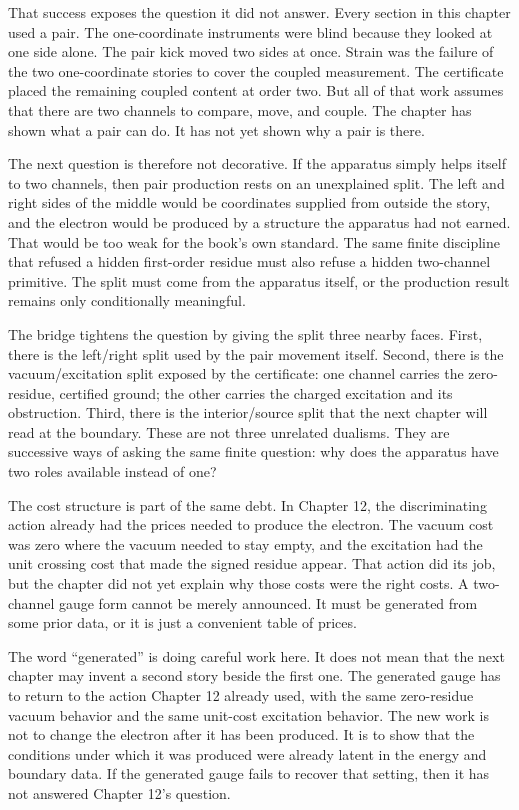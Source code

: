 That success exposes the question it did not answer. Every section in this
chapter used a pair. The one-coordinate instruments were blind because they
looked at one side alone. The pair kick moved two sides at once. Strain was the
failure of the two one-coordinate stories to cover the coupled measurement. The
certificate placed the remaining coupled content at order two. But all of that
work assumes that there are two channels to compare, move, and couple. The
chapter has shown what a pair can do. It has not yet shown why a pair is there.

The next question is therefore not decorative. If the apparatus simply helps
itself to two channels, then pair production rests on an unexplained split. The
left and right sides of the middle would be coordinates supplied from outside
the story, and the electron would be produced by a structure the apparatus had
not earned. That would be too weak for the book's own standard. The same
finite discipline that refused a hidden first-order residue must also refuse a
hidden two-channel primitive. The split must come from the apparatus itself, or
the production result remains only conditionally meaningful.

The bridge tightens the question by giving the split three nearby faces. First,
there is the left/right split used by the pair movement itself. Second, there is
the vacuum/excitation split exposed by the certificate: one channel carries the
zero-residue, certified ground; the other carries the charged excitation and its
obstruction. Third, there is the interior/source split that the next chapter
will read at the boundary. These are not three unrelated dualisms. They are
successive ways of asking the same finite question: why does the apparatus have
two roles available instead of one?

The cost structure is part of the same debt. In Chapter 12, the discriminating
action already had the prices needed to produce the electron. The vacuum cost
was zero where the vacuum needed to stay empty, and the excitation had the unit
crossing cost that made the signed residue appear. That action did its job, but
the chapter did not yet explain why those costs were the right costs. A
two-channel gauge form cannot be merely announced. It must be generated from
some prior data, or it is just a convenient table of prices.

The word ``generated'' is doing careful work here. It does not mean that the
next chapter may invent a second story beside the first one. The generated
gauge has to return to the action Chapter 12 already used, with the same
zero-residue vacuum behavior and the same unit-cost excitation behavior. The
new work is not to change the electron after it has been produced. It is to
show that the conditions under which it was produced were already latent in the
energy and boundary data. If the generated gauge fails to recover that setting,
then it has not answered Chapter 12's question.

